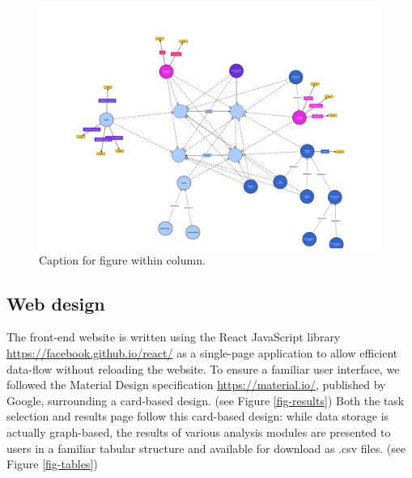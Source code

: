\documentclass[a4,center,fleqn]{NAR}
\begin{document}
\begin{figure}[t]
\begin{center}
\includegraphics{images/spfy_ontology-1.svg}
\end{center}
\caption{Caption for figure within column.}
\label{fig-ontology}
\end{figure}

\subsection{Web design}

The front-end website is written using the React JavaScript library \url{https://facebook.github.io/react/} as a single-page application to allow efficient data-flow without reloading the website.
To ensure a familiar user interface, we followed the Material Design specification \url{https://material.io/}, published by Google, surrounding a card-based design.
(see Figure \ref{fig-results})
Both the task selection and results page follow this card-based design: while data storage is actually graph-based, the results of various analysis modules are presented to users in a familiar tabular structure and available for download as .csv files.
(see Figure \ref{fig-tables})
\end{document}
